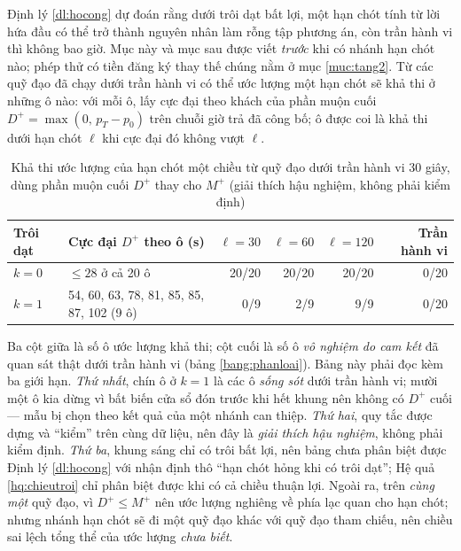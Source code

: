 Định lý \ref{dl:hocong} dự đoán rằng dưới trôi dạt bất lợi, một hạn chót tính từ lời hứa đầu có
thể trở thành nguyên nhân làm rỗng tập phương án, còn trần hành vi thì không bao giờ. Mục này và
mục sau được viết \emph{trước} khi có nhánh hạn chót nào; phép thử có tiền đăng ký thay thế chúng
nằm ở mục \ref{muc:tang2}. Từ các quỹ đạo đã chạy dưới trần hành vi có thể ước
lượng một hạn chót sẽ khả thi ở những ô nào: với mỗi ô, lấy cực đại theo khách của phần muộn cuối
$D^{+} = \max(0,\, p_T - p_0)$ trên chuỗi giờ trả đã công bố; ô được coi là khả thi dưới hạn chót
$\ell$ khi cực đại đó không vượt $\ell$.

\begin{table}[htbp]
\centering
\caption{Khả thi ước lượng của hạn chót một chiều từ quỹ đạo dưới trần hành vi 30 giây, dùng phần
muộn cuối $D^{+}$ thay cho $M^{+}$ (giải thích hậu nghiệm, không phải kiểm định)}
\label{bang:haunghiem}
\small
\begin{tabular}{@{}lp{4.2cm}rrrr@{}}
\toprule
\textbf{Trôi dạt} & \textbf{Cực đại $D^{+}$ theo ô (s)} & $\ell = 30$ & $\ell = 60$ & $\ell = 120$
& \textbf{Trần hành vi}\\
\midrule
$k = 0$ & $\le 28$ ở cả 20 ô & 20/20 & 20/20 & 20/20 & 0/20\\
$k = 1$ & 54, 60, 63, 78, 81, 85, 85, 87, 102 (9 ô) & 0/9 & 2/9 & 9/9 & 0/20\\
\bottomrule
\end{tabular}
\end{table}

Ba cột giữa là số ô ước lượng khả thi; cột cuối là số ô \emph{vô nghiệm do cam kết} đã quan sát
thật dưới trần hành vi (bảng \ref{bang:phanloai}). Bảng này phải đọc kèm ba giới hạn.
\emph{Thứ nhất}, chín ô ở $k = 1$ là các ô \emph{sống sót} dưới trần hành vi; mười một ô kia dừng
vì bất biến cửa sổ đón trước khi hết khung nên không có $D^{+}$ cuối --- mẫu bị chọn theo kết quả
của một nhánh can thiệp. \emph{Thứ hai}, quy tắc được dựng và ``kiểm'' trên cùng dữ liệu, nên đây là
\emph{giải thích hậu nghiệm}, không phải kiểm định. \emph{Thứ ba}, khung sáng chỉ có trôi bất lợi,
nên bảng chưa phân biệt được Định lý \ref{dl:hocong} với nhận định thô ``hạn chót hỏng khi có trôi
dạt''; Hệ quả \ref{hq:chieutroi} chỉ phân biệt được khi có cả chiều thuận lợi. Ngoài ra, trên
\emph{cùng một} quỹ đạo, vì $D^{+} \le M^{+}$ nên ước lượng nghiêng về phía lạc quan cho hạn chót;
nhưng nhánh hạn chót sẽ đi một quỹ đạo khác với quỹ đạo tham chiếu, nên chiều sai lệch tổng thể
của ước lượng \emph{chưa biết}.

